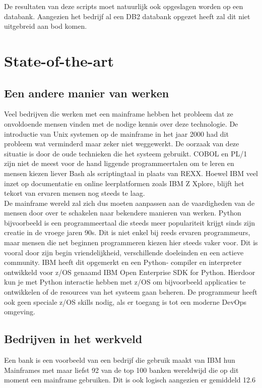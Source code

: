De resultaten van deze scripts moet natuurlijk ook opgeslagen worden op een databank. Aangezien het bedrijf al een DB2 databank opgezet heeft zal dit niet uitgebreid aan bod komen.



\section{State-of-the-art}%
\label{sec:state-of-the-art}

\subsection{Een andere manier van werken}
Veel bedrijven die werken met een mainframe hebben het probleem dat ze onvoldoende mensen vinden met de nodige kennis over deze technologie. De introductie van Unix systemen op de mainframe in het jaar 2000 \autocite{Mertic2020} had dit probleem wat verminderd maar zeker niet weggewerkt. De oorzaak van deze situatie is door de oude technieken die het systeem gebruikt. COBOL en PL/1 zijn niet de meest voor de hand liggende programmeertalen om te leren en mensen kiezen liever Bash als scriptingtaal in plaats van REXX. Hoewel IBM veel inzet op documentatie en online leerplatformen zoals IBM Z Xplore, blijft het tekort van ervaren mensen nog steeds te laag. \\

De mainframe wereld zal zich dus moeten aanpassen aan de vaardigheden van de mensen door over te schakelen naar bekendere manieren van werken. 
Python bijvoorbeeld is een programmeertaal die steeds meer populariteit krijgt sinds zijn creatie in de vroege jaren 90s. Dit is niet enkel bij reeds ervaren programmeurs, maar mensen die net beginnen programmeren kiezen hier steeds vaker voor. Dit is vooral door zijn begin vriendelijkheid, verschillende doeleinden en een actieve community. \autocite{Johnson2023}
IBM heeft dit opgemerkt en een Python- compiler en interpreter ontwikkeld voor z/OS genaamd IBM Open Enterprise SDK for Python. Hierdoor kun je met Python interactie hebben met z/OS om bijvoorbeeld applicaties te ontwikkelen of de resources van het systeem gaan beheren. De programmeur heeft ook geen speciale z/OS skills nodig, als er toegang is tot een moderne DevOps omgeving. \autocite{Klaey2023}

\subsection{Bedrijven in het werkveld}
Een bank is een voorbeeld van een bedrijf die gebruik maakt van IBM hun Mainframes met maar liefst 92 van de top 100 banken wereldwijd die op dit moment een mainframe gebruiken. Dit is ook logisch aangezien er gemiddeld 12.6 \autocite{Wagle2017} 

